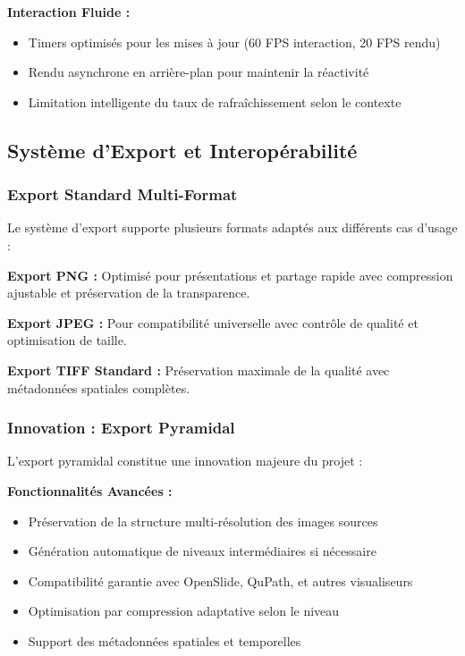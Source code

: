 \documentclass[12pt,a4paper]{article}
\begin{document}
\textbf{Interaction Fluide :}
\begin{itemize}
\item Timers optimisés pour les mises à jour (60 FPS interaction, 20 FPS rendu)
\item Rendu asynchrone en arrière-plan pour maintenir la réactivité
\item Limitation intelligente du taux de rafraîchissement selon le contexte
\end{itemize}

\subsection{Système d'Export et Interopérabilité}

\subsubsection{Export Standard Multi-Format}

Le système d'export supporte plusieurs formats adaptés aux différents cas d'usage :

\textbf{Export PNG :} Optimisé pour présentations et partage rapide avec compression ajustable et préservation de la transparence.

\textbf{Export JPEG :} Pour compatibilité universelle avec contrôle de qualité et optimisation de taille.

\textbf{Export TIFF Standard :} Préservation maximale de la qualité avec métadonnées spatiales complètes.

\subsubsection{Innovation : Export Pyramidal}

L'export pyramidal constitue une innovation majeure du projet :

\textbf{Fonctionnalités Avancées :}
\begin{itemize}
\item Préservation de la structure multi-résolution des images sources
\item Génération automatique de niveaux intermédiaires si nécessaire
\item Compatibilité garantie avec OpenSlide, QuPath, et autres visualiseurs
\item Optimisation par compression adaptative selon le niveau
\item Support des métadonnées spatiales et temporelles
\end{itemize}
\end{document}
